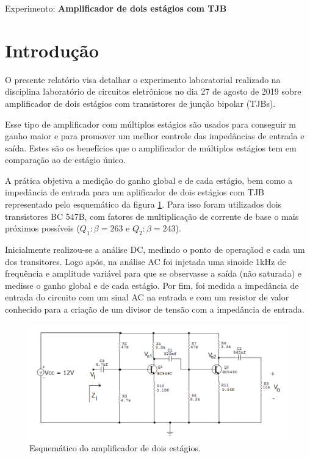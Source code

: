 \begin{center}
\large Experimento: \textbf{Amplificador de dois estágios com TJB}
\end{center}


\section{Introdução}

O presente relatório visa detalhar o experimento laboratorial realizado na disciplina laboratório de circuitos eletrônicos no dia 27 de agosto de 2019 sobre amplificador de dois estágios com transistores de junção bipolar (TJBs). 

Esse tipo de amplificador com múltiplos estágios são usados para conseguir m ganho maior e para promover um melhor controle das impedâncias de entrada e saída. Estes são os benefícios que o amplificador de múltiplos estágios tem em comparação ao de estágio único.

A prática objetiva a medição do ganho global e de cada estágio, bem como a impedância de entrada para um aplificador de dois estágios com TJB representado pelo esquemático da figura \ref{fig:1}. Para isso foram utilizados dois transistores BC 547B, com fatores de multiplicação de corrente de base o mais próximos possíveis ($Q_1: \beta = 263$ e $Q_2: \beta = 243$). 

Inicialmente realizou-se a análise DC, medindo o ponto de operaçãod e cada um dos transitores. Logo após, na análise AC foi injetada uma sinoide 1kHz de frequência e amplitude variável para que se observasse a saída (não saturada) e medisse o ganho global e de cada estágio. Por fim, foi medida a impedância de entrada do circuito com um sinal AC na entrada e com um resistor de valor conhecido para a criação de um divisor de tensão com a impedância de entrada.

\begin{figure}[H] 
\includegraphics[scale=0.6]{imagens/ckt.png} 
\centering
\caption{Esquemático do amplificador de dois estágios.}
\label{fig:1} 
\end{figure} 

